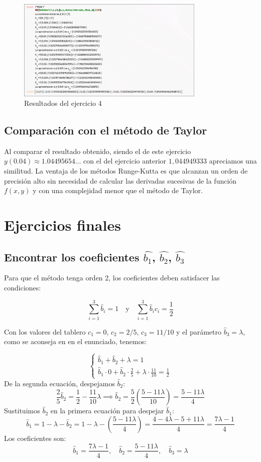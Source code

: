 \documentclass{article}
\begin{document}
\begin{figure}[h]
    \centering
    \includegraphics[width=0.8\textwidth]{src/ej4.png}
    \caption{Resultados del ejercicio 4}
    \label{fig:ejercicio4}
\end{figure}


\subsection{Comparación con el método de Taylor}


Al comparar el resultado obtenido, siendo el de este ejercicio $y(0.04) \approx 1.04495654...$ con el del ejercicio anterior $1,044949333$ apreciamos una similitud. La ventaja de los métodos Runge-Kutta es que alcanzan un orden de precisión alto sin necesidad de calcular las derivadas sucesivas de la función $f(x,y)$ y con una complejidad menor que el método de Taylor.


\section{Ejercicios finales}
\subsection{Encontrar los coeficientes $\hat{b_1}$, $\hat{b_2}$, $\hat{b_3}$}

Para que el método tenga orden 2, los coeficientes deben satisfacer las condiciones:

$$
\sum_{i=1}^{3} \hat{b}_{i} = 1 \quad \text{y} \quad \sum_{i=1}^{3} \hat{b}_{i} c_{i} = \frac{1}{2}
$$

Con los valores del tablero $c_1=0$, $c_2=2/5$, $c_3=11/10$ y el parámetro $\hat{b}_3 = \lambda$, como se aconseja en en el enunciado, tenemos:

$$
\begin{cases}
\hat{b}_{1} + \hat{b}_{2} + \lambda = 1 \\
\hat{b}_{1} \cdot 0 + \hat{b}_{2} \cdot \frac{2}{5} + \lambda \cdot \frac{11}{10} = \frac{1}{2}
\end{cases}
$$
De la segunda ecuación, despejamos $\hat{b}_2$:
$$
\frac{2}{5}\hat{b}_{2} = \frac{1}{2} - \frac{11}{10}\lambda \implies \hat{b}_{2} = \frac{5}{2} \left( \frac{5 - 11\lambda}{10} \right) = \frac{5 - 11\lambda}{4}
$$
Sustituimos $\hat{b}_2$ en la primera ecuación para despejar $\hat{b}_1$:
$$
\hat{b}_{1} = 1 - \lambda - \hat{b}_{2} = 1 - \lambda - \left(\frac{5 - 11\lambda}{4}\right) = \frac{4 - 4\lambda - 5 + 11\lambda}{4} = \frac{7\lambda - 1}{4}
$$
Los coeficientes son:
$$
\hat{b}_{1} = \frac{7\lambda - 1}{4}, \quad \hat{b}_{2} = \frac{5 - 11\lambda}{4}, \quad \hat{b}_{3} = \lambda
$$
\end{document}
